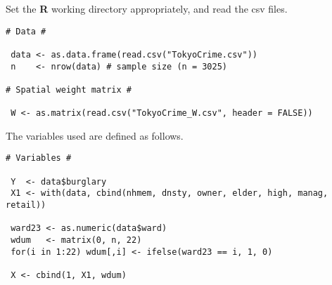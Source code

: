 \documentclass[11pt, A4paper, openany, uplatex]{book}
\begin{document}
Set the \textbf{R} working directory appropriately, and read the csv files.
\begin{lstlisting}[basicstyle=\ttfamily\footnotesize, frame=single]
# Data #

 data <- as.data.frame(read.csv("TokyoCrime.csv"))
 n    <- nrow(data) # sample size (n = 3025)

# Spatial weight matrix #

 W <- as.matrix(read.csv("TokyoCrime_W.csv", header = FALSE))
\end{lstlisting}
The variables used are defined as follows.
\begin{lstlisting}[basicstyle=\ttfamily\footnotesize, frame=single]
# Variables #

 Y  <- data$burglary
 X1 <- with(data, cbind(nhmem, dnsty, owner, elder, high, manag, retail))

 ward23 <- as.numeric(data$ward)
 wdum   <- matrix(0, n, 22)
 for(i in 1:22) wdum[,i] <- ifelse(ward23 == i, 1, 0)

 X <- cbind(1, X1, wdum)
\end{lstlisting}
\end{document}
